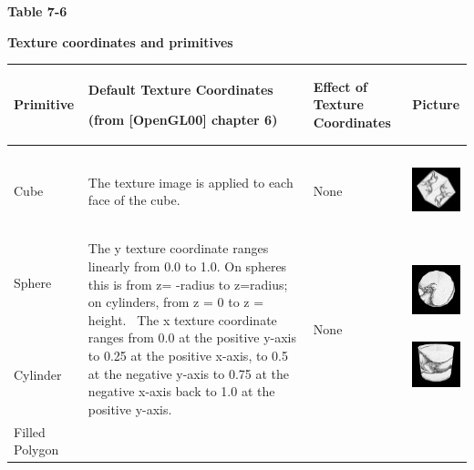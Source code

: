 
{\centering\sffamily\bfseries
Table 7-6
\par}

{\centering\sffamily\bfseries
Texture coordinates and primitives
\par}

\begin{center}
\tablehead{}
\begin{supertabular}{|m{0.7122598in}|m{3.22956in}|m{0.9816598in}|m{0.7559598in}|}
\hline
Primitive &
Default Texture Coordinates

(from [OpenGL00] chapter 6) &
Effect of Texture Coordinates &
Picture\\\hline
Cube &
The texture image is applied to each face of the cube.  &
None &
\begin{center}
\includegraphics[width=0.6602in,height=0.6602in]{ub-img/ub-img24.jpg}
\end{center}
\\\hline
Sphere

~

~

Cylinder &
The y texture coordinate ranges linearly from 0.0 to 1.0. On spheres
this is from\newline
z= -radius to z=radius; on cylinders, from\newline
z = 0 to z = height. \ The x texture coordinate ranges from 0.0 at the
positive y-axis to 0.25 at the positive x-axis, to 0.5 at the
negative\newline
y-axis to 0.75 at the negative x-axis back to 1.0 at the positive
y-axis.  &
None &


\begin{center}
\includegraphics[width=0.6602in,height=0.6602in]{ub-img/ub-img25.jpg}
\end{center}
\begin{center}
\includegraphics[width=0.6602in,height=0.6602in]{ub-img/ub-img26.jpg}
\end{center}
\\\hline
Filled Polygon


\end{supertabular}
\end{center}
